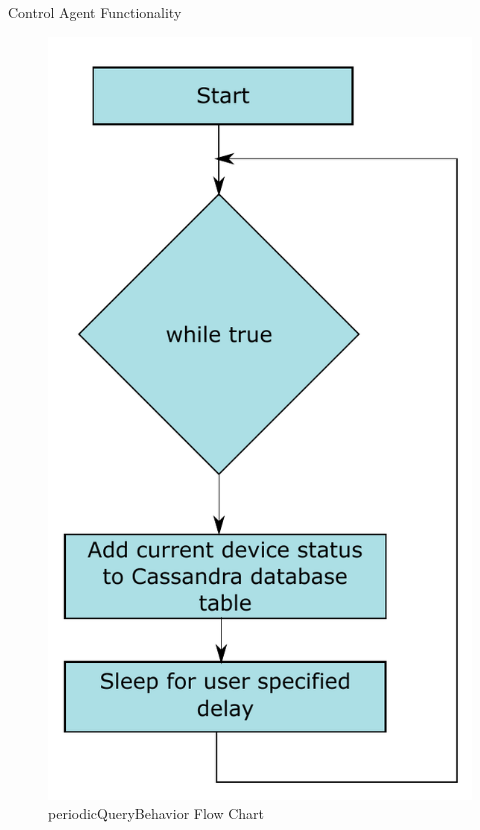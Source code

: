 \documentclass{beamer}
\begin{document}
\begin{frame}{Control Agent Functionality}{}
    \begin{figure}
        \centering
        \includegraphics[scale=0.3]{figs/agents/periodicQueryBehaviorFlow.pdf}
        \caption{periodicQueryBehavior Flow Chart}
        \label{fig:periodicQueryBehavior}
    \end{figure}
\end{frame}
\end{document}
